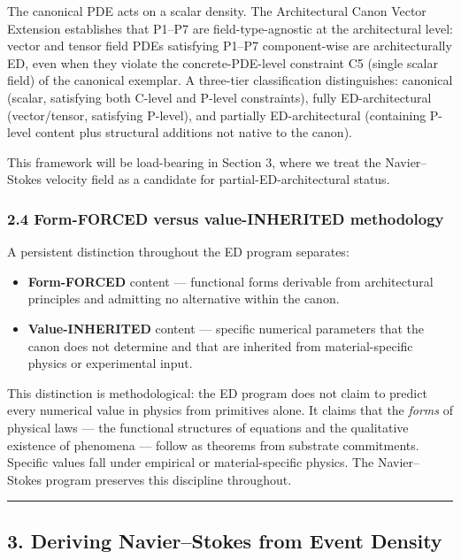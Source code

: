 \documentclass[
]{article}
\providecommand{\tightlist}{%
  \setlength{\itemsep}{0pt}\setlength{\parskip}{0pt}}
\begin{document}
The canonical PDE acts on a scalar density. The Architectural Canon
Vector Extension establishes that P1--P7 are field-type-agnostic at the
architectural level: vector and tensor field PDEs satisfying P1--P7
component-wise are architecturally ED, even when they violate the
concrete-PDE-level constraint C5 (single scalar field) of the canonical
exemplar. A three-tier classification distinguishes: canonical (scalar,
satisfying both C-level and P-level constraints), fully ED-architectural
(vector/tensor, satisfying P-level), and partially ED-architectural
(containing P-level content plus structural additions not native to the
canon).

This framework will be load-bearing in Section 3, where we treat the
Navier--Stokes velocity field as a candidate for
partial-ED-architectural status.

\subsubsection{2.4 Form-FORCED versus value-INHERITED
methodology}\label{form-forced-versus-value-inherited-methodology}

A persistent distinction throughout the ED program separates:

\begin{itemize}
\tightlist
\item
  \textbf{Form-FORCED} content --- functional forms derivable from
  architectural principles and admitting no alternative within the
  canon.
\item
  \textbf{Value-INHERITED} content --- specific numerical parameters
  that the canon does not determine and that are inherited from
  material-specific physics or experimental input.
\end{itemize}

This distinction is methodological: the ED program does not claim to
predict every numerical value in physics from primitives alone. It
claims that the \emph{forms} of physical laws --- the functional
structures of equations and the qualitative existence of phenomena ---
follow as theorems from substrate commitments. Specific values fall
under empirical or material-specific physics. The Navier--Stokes program
preserves this discipline throughout.

\begin{center}\rule{0.5\linewidth}{0.5pt}\end{center}

\subsection{3. Deriving Navier--Stokes from Event
Density}\label{deriving-navierstokes-from-event-density}
\end{document}
